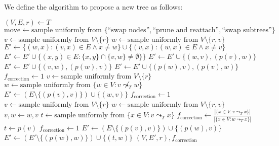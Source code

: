 \begin{definition} We define the algorithm to propose a new tree as follows:
    \begin{algorithmic}
            \State $(V, E, r) \leftarrow T$
            \State $\mathrm{move} \leftarrow \text{sample uniformly from } \{\text{``swap nodes''}, \text{``prune and reattach''}, \text{``swap subtrees''}\}$
                \State $v \leftarrow \text{sample uniformly from } V \setminus \{r\}$
                \State $w \leftarrow \text{sample uniformly from } V \setminus \{r, v\}$
                \State $E' \leftarrow \{(w, x) : (v, x) \in E \wedge x \neq w\} \cup \{(v, x) : (w, x) \in E \wedge x \neq v\}$
                \State $E' \leftarrow E' \cup \{(x, y) \in E: \{x, y\} \cap \{v, w\} \neq \emptyset\}\}$
                    \State $E' \leftarrow E' \cup \{(w, v), (p(v), w)\}$
                    \State $E' \leftarrow E' \cup \{(v, w), (p(w), v)\}$
                \Else
                    \State $E' \leftarrow E' \cup \{(p(w), v), (p(v), w)\}$
                \EndIf
                \State $f_\mathrm{correction} \leftarrow 1$
                \State $v \leftarrow \text{sample uniformly from } V \setminus \{r\}$
                \State $w \leftarrow \text{sample uniformly from } \{w \in V : v \not\leadsto_T w\}$
                \State $E' \leftarrow \left(E \setminus \{(p(v), v)\}\right)  \cup \{(w, v)\}$
                \State $f_\mathrm{correction} \leftarrow 1$
                \State $v \leftarrow \text{sample uniformly from } V \setminus \{r\}$
                \State $w \leftarrow \text{sample uniformly from } V \setminus \{r, v\}$
                    \State $v, w \leftarrow w, v$
                \EndIf
                    \State $t \leftarrow \text{sample uniformly from } \{x \in V: v \leadsto_T x\}$
                    \State $f_\mathrm{correction} \leftarrow \frac{|\{x \in V : v \leadsto_T x\}|}{|\{x \in V : w \leadsto_T x\}|}$
                \Else
                    \State $t \leftarrow p(v)$
                    \State $f_\mathrm{correction} \leftarrow 1$
                \EndIf
                \State $E' \leftarrow (E \setminus \{(p(v), v)\}) \cup \{(p(w), v)\}$ 
                \State $E' \leftarrow (E' \setminus \{(p(w), w)\}) \cup \{(t, w)\}$
            \EndIf
            \State \Return $(V, E', r), f_\mathrm{correction}$
        \EndFunction
    \end{algorithmic}
\end{definition}

